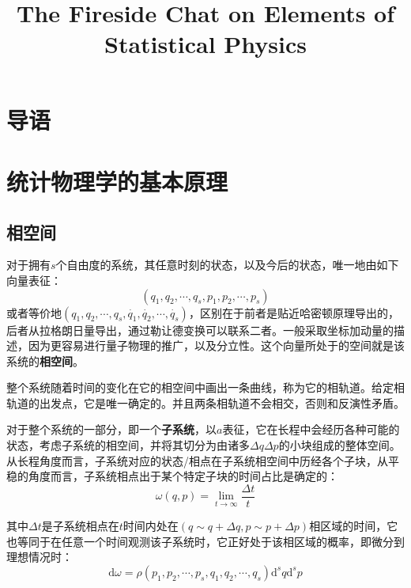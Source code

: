 \documentclass[UTF8]{ctexart}
\begin{document}
\begin{spacing}{2.0}

\title{The Fireside Chat on Elements of Statistical Physics}
\date{}
\maketitle
\tableofcontents
\newpage
\section{导语}

\newpage
\section{统计物理学的基本原理}
\label{section:1}
\subsection{相空间}
对于拥有$s$个自由度的系统，其任意时刻的状态，以及今后的状态，唯一地由如下向量表征：
\begin{equation}
(q_{1},q_{2},\cdots,q_{s},p_{1},p_{2},\cdots,p_{s})
\end{equation}
或者等价地$(q_{1},q_{2},\cdots,q_{s},\dot{q_{1}},\dot{q_{2}},\cdots,\dot{q_{s}})$，区别在于前者是贴近哈密顿原理导出的，后者从拉格朗日量导出，通过勒让德变换可以联系二者。一般采取坐标加动量的描述，因为更容易进行量子物理的推广，以及分立性。这个向量所处于的空间就是该系统的\textbf{相空间}。

整个系统随着时间的变化在它的相空间中画出一条曲线，称为它的相轨道。给定相轨道的出发点，它是唯一确定的。并且两条相轨道不会相交，否则和反演性矛盾。

对于整个系统的一部分，即一个\textbf{子系统}，以$a$表征，它在长程中会经历各种可能的状态，考虑子系统的相空间，并将其切分为由诸多$\Delta q\Delta p$的小块组成的整体空间。从长程角度而言，子系统对应的状态/相点在子系统相空间中历经各个子块，从平稳的角度而言，子系统相点出于某个特定子块的时间占比是确定的：
\begin{equation}
\omega(q,p)=\lim_{t\rightarrow \infty}\frac{\Delta t}{t}
\end{equation}

其中$\Delta t$是子系统相点在$t$时间内处在$(q\sim q+\Delta q,p\sim p+\Delta p)$相区域的时间，它也等同于在任意一个时间观测该子系统时，它正好处于该相区域的概率，即微分到理想情况时：
\begin{equation}
\text{d} \omega = \rho(p_{1},p_{2},\cdots,p_{s},q_{1},q_{2},\cdots,q_{s}) \text{d}^{s}q\text{d}^{s} p
\end{equation}


\end{spacing}
\end{document}
